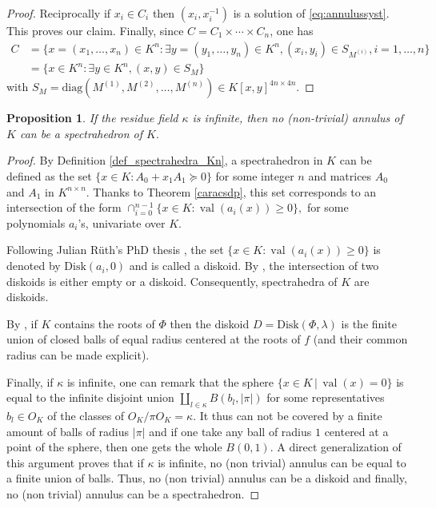 \documentclass[a4paper,oneside,11pt]{article}
\newtheorem{proposition}[theorem]{Proposition}
\DeclareMathOperator{\val}{val}
\def\diag{\mathrm{diag}}
\begin{document}
\begin{proof}
Reciprocally if $x_i \in C_i$ then $(x_i,x_i^{-1})$ is a solution of \eqref{eq:annulussyst}.
This proves our claim.
Finally, since $C = C_1 \times \cdots \times C_n$, one has
\begin{equation*}
  \begin{aligned}
    C &=
    \{x=(x_1,\ldots,x_n) \in K^n : \exists y = (y_1,\ldots,y_n) \in K^n, (x_i,y_i) \in S_{M^{(i)}}, i=1,\ldots,n\} \\
    &= \{x \in K^n : \exists y \in K^n, (x,y) \in S_M\}
  \end{aligned}
\end{equation*}
with $S_M = \diag\left(M^{(1)}, M^{(2)}, \ldots, M^{(n)}\right) \in K[x,y]^{4n \times 4n}.$
\end{proof}


\begin{proposition}
If the residue field $\kappa$ is infinite, then
no (non-trivial) annulus of $K$ can be a spectrahedron of $K.$
\end{proposition}
\begin{proof}
By Definition \ref{def_spectrahedra_Kn}, a spectrahedron in $K$ 
can be defined as the set $\{x \in K : A_0+x_1A_1 \succeq 0\}$
for some integer $n$ and matrices $A_0$ and $A_1$ in $K^{n \times n}$.
Thanks to Theorem \ref{caracsdp},
this set corresponds to an intersection of the form
$\cap_{i=0}^{n-1} \{ x \in K : \val(a_i(x)) \geq 0 \},$
for some polynomials $a_i$'s, univariate over $K$.

Following Julian Rüth's PhD thesis \cite{ruth_models_2015},
the set $\{ x \in K : \val(a_i(x)) \geq 0 \}$
is denoted by $\textrm{Disk}(a_i,0)$ and is called 
a diskoid.
By \cite[Lemma 4.44]{ruth_models_2015}, the intersection
of two diskoids is either empty or a diskoid.
Consequently, spectrahedra of $K$ are diskoids.

By \cite[Lemma 4.43]{ruth_models_2015}, if $K$
contains the roots of $\Phi$ then the diskoid
$D=\textrm{Disk}(\Phi, \lambda)$ is the finite union
of closed balls of equal radius centered at the roots of $f$ (and their common radius can be made explicit).

Finally, if $\kappa$ is infinite, one can remark that the sphere
$\{x \in K \,|\,  \val(x) =0\}$ is equal to the infinite disjoint union $\amalg_{l \in \kappa} B(b_l, \vert \pi \vert)$ for some 
representatives $b_l \in O_K$ of the classes of $O_K / \pi O_K=\kappa.$
It thus can not be covered by a finite amount of balls of radius $\vert \pi \vert$
and if one take any ball of radius $1$ centered at a point of the sphere, then one gets the whole
$B(0,1).$
A direct generalization of this argument proves that
if $\kappa$ is infinite, no (non trivial) annulus can be equal to
a finite union of balls. Thus, no (non trivial) annulus can be a diskoid and finally, no (non trivial) annulus can be a spectrahedron.
\end{proof}
\end{document}
